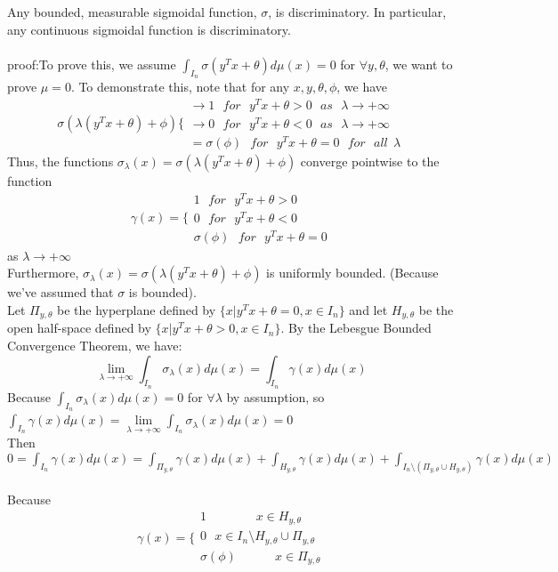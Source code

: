 Any bounded, measurable sigmoidal function, $\sigma$, is discriminatory. In particular, any continuous sigmoidal function is discriminatory.
~\\~\\proof:To prove this, we assume $\int_{I_n}\sigma(y^Tx+\theta)d\mu(x)=0$ for $\forall y,\theta$, we want to prove $\mu=0$. To demonstrate this, note that for any $x,y,\theta,\phi$, we have
$$\sigma(\lambda(y^Tx+\theta)+\phi) \Big\{
\begin{aligned}
\rightarrow1 \ \ \ for \ \ \ y^Tx+\theta>0 \ \ \ as \ \ \ \lambda\rightarrow + \infty \\
\rightarrow0 \ \ \ for \ \ \ y^Tx+\theta<0  \ \ \ as \ \ \ \lambda\rightarrow + \infty \\
=\sigma(\phi) \ \ \ for \ \ \ y^Tx+\theta=0 \ \ \ for \ \ \ all \ \ \lambda
\end{aligned}$$
Thus, the functions $\sigma_\lambda(x)=\sigma(\lambda(y^Tx+\theta)+\phi)$ converge pointwise to the function
$$\gamma(x) =\Big\{
\begin{aligned}
1 \ \ \ for \ \ \ y^Tx+\theta>0 \\
0 \ \ \ for \ \ \ y^Tx+\theta<0 \\
\sigma(\phi) \ \ \ for \ \ \ y^Tx+\theta=0
\end{aligned}$$
as $\lambda\rightarrow + \infty$
~\\Furthermore, $\sigma_\lambda(x)=\sigma(\lambda(y^Tx+\theta)+\phi)$ is uniformly bounded. (Because we've assumed that $\sigma$ is bounded).
~\\Let $\Pi_{y,\theta}$ be the hyperplane defined by $\{x|y^Tx+\theta=0, x\in I_n\}$ and let $H_{y,\theta}$ be the open half-space defined by $\{x|y^Tx+\theta>0, x\in I_n\}$. By the Lebesgue Bounded Convergence Theorem, we have:
$$\mathop{lim}\limits_{\lambda\rightarrow+ \infty}\int_{I_n}\sigma_{\lambda}(x)d\mu(x)=\int_{I_n}\gamma(x)d\mu(x)$$
Because $\int_{I_n}\sigma_{\lambda}(x)d\mu(x)=0$ for $\forall \lambda$ by assumption, so $\int_{I_n}\gamma(x)d\mu(x)=\mathop{lim}\limits_{\lambda\rightarrow+ \infty}\int_{I_n}\sigma_{\lambda}(x)d\mu(x)=0$
~\\Then $0=\int_{I_n}\gamma(x)d\mu(x)=\int_{\Pi_{y,\theta}}\gamma(x)d\mu(x)+\int_{H_{y,\theta}}\gamma(x)d\mu(x)+\int_{I_n\setminus (\Pi_{y,\theta}\cup H_{y,\theta})}\gamma(x)d\mu(x)$
~\\Because $$\gamma(x) =\Big\{
\begin{aligned}
1 \ \ \ \ \ \ \ \ \ \ \ \ \ \ \ \ \ \ x\in H_{y,\theta} \\
0 \ \ \ x\in I_n\setminus H_{y,\theta}\cup \Pi_{y,\theta} \\
\sigma(\phi) \ \ \ \ \ \ \ \ \ \ \ \ \ \ x\in \Pi_{y,\theta}
\end{aligned}$$
